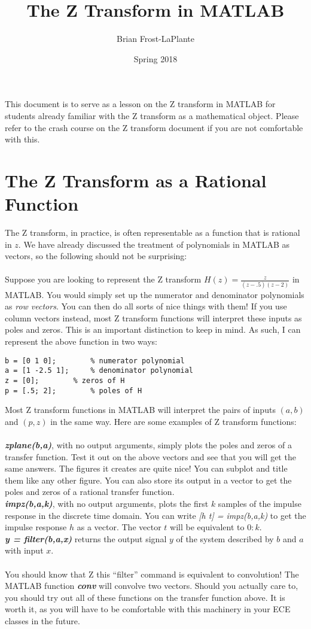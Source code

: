 \documentclass{article}
\title{The Z Transform in MATLAB}
\author{Brian Frost-LaPlante}
\date{Spring 2018}
\begin{document}
\maketitle
\noindent This document is to serve as a lesson on the Z transform in MATLAB for students already familiar with 
the Z transform as a mathematical object. Please refer to the crash course on the Z transform document if you 
are not comfortable with this.

\section*{The Z Transform as a Rational Function}
\noindent The Z transform, in practice, is often representable as a function that is rational in $z$. We have 
already discussed the treatment of polynomials in MATLAB as vectors, so the following should not be surprising: \\ \\
\noindent Suppose you are looking to represent the Z transform $H(z) = \frac{z}{(z-.5)(z-2)}$ in MATLAB. You would simply set 
up the numerator and denominator polynomials as \textit{row vectors}. You can then do all sorts of nice things with them! 
If you use column vectors instead, most Z transform functions will interpret these inputs as poles and zeros. This is an 
important distinction to keep in mind. As such, I can represent the above function in two ways:

\begin{verbatim}
b = [0 1 0];		% numerator polynomial
a = [1 -2.5 1];  	% denominator polynomial
z = [0];		% zeros of H
p = [.5; 2]; 		% poles of H
\end{verbatim}

\noindent  Most Z transform functions in MATLAB will interpret the pairs of inputs $(a,b)$ and $(p,z)$ in the same way. 
Here are some examples of Z transform functions: \\ \\
\noindent \textbf{\textit{zplane(b,a)}}, with no output arguments, simply plots the poles and zeros of a transfer function. Test it out on 
the above vectors and see that you will get the same answers. The figures it creates are quite nice! You can subplot and title 
them like any other figure. You can also store its output in a vector to get the poles and zeros of a rational transfer function. \\ 
\textbf{\textit{impz(b,a,k)}}, with no output arguments, plots the first $k$ samples of the impulse response in the discrete time domain. 
You can write \textit{[h t] = impz(b,a,k)} to get the impulse response $h$ as a vector. The vector $t$ will be equivalent to $0:k$. \\
\textbf{\textit{y = filter(b,a,x)}} returns the output signal $y$ of the system described by $b$ and $a$ with input $x$. \\ \\
\noindent You should know that Z this ``filter'' command is equivalent to convolution! The MATLAB function \textbf{\textit{conv}} will convolve 
two vectors. Should you actually care to, you should try out all of these functions on the transfer function above. It is worth it, 
as you will have to be comfortable with this machinery in your ECE classes in the future.
\end{document}
